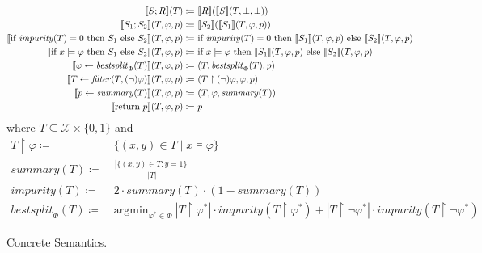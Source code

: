 \begin{figure}
\centering
\begin{align*}
\den{S ; R}(T) \coloneqq&~ \den{R}(\den{S}(T, \bot, \bot)) \\
%
\den{S_1 ; S_2}(T, \varphi, p) \coloneqq&~ \den{S_2}(\den{S_1}(T, \varphi, p)) \\
%
\den{\text{if } \mathit{impurity}(T) = 0 \text{ then } S_1 \text{ else } S_2}(T, \varphi, p)
\coloneqq&~
\text{if } \mathit{impurity}(T) = 0 \text{ then } \den{S_1}(T, \varphi, p)
\text{ else } \den{S_2}(T, \varphi, p) \\
%
\den{\text{if } x \models \varphi \text{ then } S_1 \text{ else } S_2}(T, \varphi, p) \coloneqq&~
\text{if } x \models \varphi \text{ then } \den{S_1}(T, \varphi, p)
\text{ else } \den{S_2}(T, \varphi, p) \\
%
\den{\varphi \gets \mathit{bestsplit}_\Phi(T)}(T, \varphi, p) \coloneqq&~
(T, \mathit{bestsplit}_\Phi(T), p) \\
%
\den{T \gets \mathit{filter}(T, (\lnot)\varphi)}(T, \varphi, p) \coloneqq&~
(T \upharpoonright (\lnot)\varphi, \varphi, p) \\
%
\den{p \gets \mathit{summary}(T)}(T, \varphi, p) \coloneqq&~ (T, \varphi, \mathit{summary}(T)) \\
%
\den{\text{return } p}(T, \varphi, p) \coloneqq&~ p
\end{align*}
where $T \subseteq \mathcal{X} \times \{0,1\}$ and
\begin{align*}
T \upharpoonright \varphi \coloneqq&~ \{(x,y) \in T \mid x \models \varphi\} \\
\mathit{summary}(T) \coloneqq&~ \frac{|\{(x,y) \in T : y = 1\}|}{|T|} \\
\mathit{impurity}(T) \coloneqq&~ 2 \cdot \mathit{summary}(T) \cdot (1-\mathit{summary}(T)) \\
\mathit{bestsplit}_\Phi(T) \coloneqq&~ \text{argmin}_{\varphi^* \in \Phi}~
|T \upharpoonright \varphi^*| \cdot \mathit{impurity}(T \upharpoonright \varphi^*) +
|T \upharpoonright \lnot\varphi^*| \cdot \mathit{impurity}(T \upharpoonright \lnot\varphi^*)
\end{align*}
\caption{Concrete Semantics.}
\label{fig:concrete}
\end{figure}

